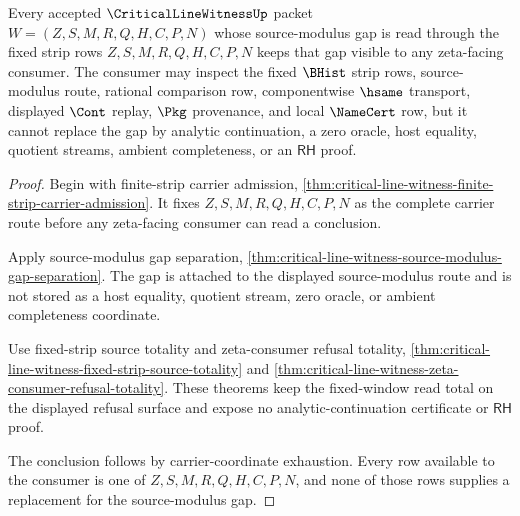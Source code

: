 \begin{theorem}
\label{thm:critical-line-witness-fixed-strip-gap-consumer-nonescape}
Every accepted $\CriticalLineWitnessUp$ packet $W=(Z,S,M,R,Q,H,C,P,N)$ whose source-modulus gap is read through the fixed strip rows $Z,S,M,R,Q,H,C,P,N$ keeps that gap visible to any zeta-facing consumer. The consumer may inspect the fixed $\BHist$ strip rows, source-modulus route, rational comparison row, componentwise $\hsame$ transport, displayed $\Cont$ replay, $\Pkg$ provenance, and local $\NameCert$ row, but it cannot replace the gap by analytic continuation, a zero oracle, host equality, quotient streams, ambient completeness, or an $\mathsf{RH}$ proof.
\end{theorem}
\begin{proof}
Begin with finite-strip carrier admission, \autoref{thm:critical-line-witness-finite-strip-carrier-admission}. It fixes $Z,S,M,R,Q,H,C,P,N$ as the complete carrier route before any zeta-facing consumer can read a conclusion.

Apply source-modulus gap separation, \autoref{thm:critical-line-witness-source-modulus-gap-separation}. The gap is attached to the displayed source-modulus route and is not stored as a host equality, quotient stream, zero oracle, or ambient completeness coordinate.

Use fixed-strip source totality and zeta-consumer refusal totality, \autoref{thm:critical-line-witness-fixed-strip-source-totality} and \autoref{thm:critical-line-witness-zeta-consumer-refusal-totality}. These theorems keep the fixed-window read total on the displayed refusal surface and expose no analytic-continuation certificate or $\mathsf{RH}$ proof.

The conclusion follows by carrier-coordinate exhaustion. Every row available to the consumer is one of $Z,S,M,R,Q,H,C,P,N$, and none of those rows supplies a replacement for the source-modulus gap.
\end{proof}

